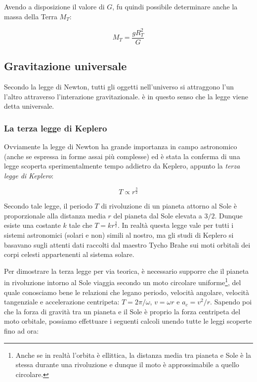 Avendo a disposizione il valore di $G$, fu quindi possibile determinare
anche la massa della Terra $M_T$:

\[ M_T = \frac{gR_T^2}{G} \]

\subsection{Gravitazione universale}
Secondo la legge di Newton, tutti gli oggetti nell'universo si attraggono l'un l'altro
attraverso l'interazione gravitazionale. è in questo senso che la legge viene detta
universale.


\subsubsection{La terza legge di Keplero}
Ovviamente la legge di Newton ha grande importanza in campo astronomico (anche
se espressa in forme assai più complesse) ed è stata la conferma di una legge scoperta
sperimentalmente tempo addietro da Keplero, appunto la \textit{terza legge di Keplero}:

\[ T \propto r^\frac{3}{2} \]

\noindent Secondo tale legge, il periodo $T$ di rivoluzione di un pianeta attorno al Sole
è proporzionale alla distanza media $r$ del pianeta dal Sole elevata a $3/2$. Dunque esiste
una costante $k$ tale che $T = kr^\frac{3}{2}$. In realtà
questa legge vale per tutti i sistemi astronomici (solari e non) simili al nostro, ma
gli studi di Keplero si basavano sugli attenti dati raccolti dal maestro Tycho Brahe
sui moti orbitali dei corpi celesti appartenenti al sistema solare.

Per dimostrare la terza legge per via teorica, è necessario supporre che il pianeta
in rivoluzione intorno al Sole viaggia secondo un moto circolare uniforme\footnote{Anche se in realtà
l'orbita è ellittica, la distanza media tra pianeta e Sole è la stessa durante una rivoluzione e dunque il
moto è approssimabile a quello circolare.}, del quale conosciamo bene le relazioni che legano periodo, velocità
angolare, velocità tangenziale e accelerazione centripeta: $T = 2\pi/\omega$, $v = \omega r$ e
$a_c = v^2/r$.
Sapendo poi che la forza di gravità tra un pianeta e il Sole è proprio la forza
centripeta del moto orbitale, possiamo effettuare i seguenti calcoli unendo tutte
le leggi scoperte fino ad ora:

